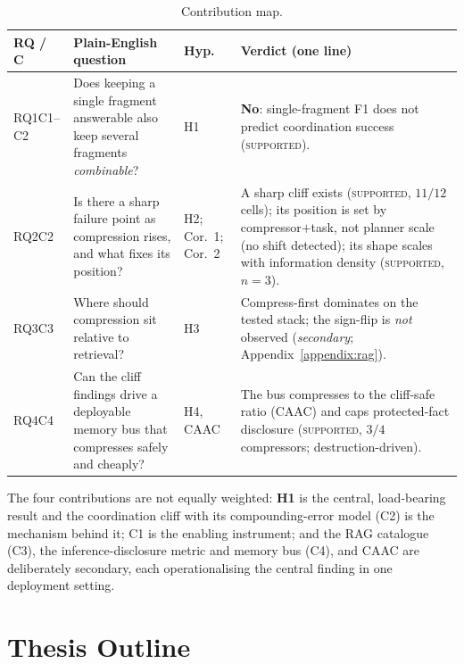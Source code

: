 \begin{table}[htbp]
\centering
\caption{Contribution map.}
\label{tab:contribution_map}
\small
\begin{tabularx}{\linewidth}{>{\raggedright\arraybackslash}p{1.2cm}
                              >{\raggedright\arraybackslash}p{3.2cm}
                              >{\raggedright\arraybackslash}p{1.6cm}
                              >{\raggedright\arraybackslash}X}
\hline
RQ / C & Plain-English question & Hyp. & Verdict (one line) \\
\hline
RQ1\newline C1--C2 & Does keeping a single fragment answerable also keep several fragments \emph{combinable}? & H1 & \textbf{No}: single-fragment F1 does not predict coordination success (\textsc{supported}). \\
RQ2\newline C2 & Is there a sharp failure point as compression rises, and what fixes its position? & H2; Cor.~1; Cor.~2 & A sharp cliff exists (\textsc{supported}, $11/12$ cells); its position is set by compressor$+$task, not planner scale (no shift detected); its shape scales with information density (\textsc{supported}, $n{=}3$). \\
RQ3\newline C3 & Where should compression sit relative to retrieval? & H3 & Compress-first dominates on the tested stack; the sign-flip is \emph{not} observed (\emph{secondary}; Appendix~\ref{appendix:rag}). \\
RQ4\newline C4 & Can the cliff findings drive a deployable memory bus that compresses safely and cheaply? & H4, CAAC & The bus compresses to the cliff-safe ratio (CAAC) and caps protected-fact disclosure (\textsc{supported}, $3/4$ compressors; destruction-driven). \\
\hline
\end{tabularx}
\end{table}

The four contributions are not equally weighted: \textbf{H1} is the
central, load-bearing result and the coordination cliff with its
compounding-error model (C2) is the mechanism behind it; C1 is the
enabling instrument; and the RAG catalogue (C3), the
inference-disclosure metric and memory bus (C4), and CAAC are
deliberately secondary, each operationalising the central finding in
one deployment setting.

\section{Thesis Outline}
\label{sec:outline}

